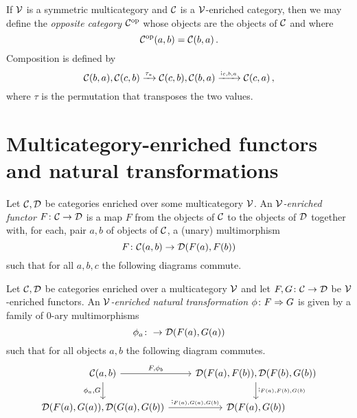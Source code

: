 \documentclass{report}[11pt]
\begin{document}
\begin{remark}
  If ${\mathcal{V}}$ is a symmetric multicategory and ${\mathcal{C}}$ is a ${\mathcal{V}}$-enriched category, then we may define the \emph{opposite category} ${\mathcal{C}}^{\mathrm{op}}$ whose objects are the objects of ${\mathcal{C}}$ and where
  \[
    {\mathcal{C}}^{\mathrm{op}}(a,b)={\mathcal{C}}(b,a)\,.
    \]
  Composition is defined by
  \[
    {\mathcal{C}}(b,a),{\mathcal{C}}(c,b) \xrightarrow{\tau_*}
    {\mathcal{C}}(c,b),{\mathcal{C}}(b,a) \xrightarrow{;_{c,b,a}}
    {\mathcal{C}}(c,a)\,,
    \]
  where $\tau$ is the permutation that transposes the two values.
\end{remark}

\section{Multicategory-enriched functors and natural transformations}

\begin{definition}
  Let ${\mathcal{C}},{\mathcal{D}}$ be categories enriched over some multicategory ${\mathcal{V}}$.  
  An \emph{${\mathcal{V}}$-enriched functor} $F \colon {\mathcal{C}} \to {\mathcal{D}}$ is a map $F$ from the objects of ${\mathcal{C}}$ to the objects of ${\mathcal{D}}$ together with, for each, pair $a,b$ of objects of ${\mathcal{C}}$, a (unary) multimorphism
  \[
    F \colon {\mathcal{C}}(a,b) \to {\mathcal{D}}(F(a),F(b))
    \]
  such that for all $a, b, c$ the following diagrams commute.
\end{definition}

\begin{definition}
  Let ${\mathcal{C}},{\mathcal{D}}$ be categories enriched over a multicategory ${\mathcal{V}}$ and let $F,G\colon {\mathcal{C}} \to {\mathcal{D}}$ be ${\mathcal{V}}$-enriched functors.
  An \emph{${\mathcal{V}}$-enriched natural transformation} $\phi\colon F \Rightarrow G$ is given by a family of $0$-ary multimorphisms
  \[
    \phi_a \colon \to {\mathcal{D}}(F(a),G(a))
    \]
  such that for all objects $a,b$ the following diagram commutes.
  \[
    \begin{tikzcd}
      \C(a,b) \arrow[r, "{F,\phi_b}"] \arrow[d, "{\phi_a,G}"']
        & \D(F(a),F(b)),\D(F(b),G(b)) \arrow[d, "{;_{F(a),F(b),G(b)}}"] \\
      \D(F(a),G(a)),\D(G(a),G(b)) \arrow[r, "{;_{F(a),G(a),G(b)}}"]
        & \D(F(a), G(b))
    \end{tikzcd}
    \]
\end{definition}
\end{document}
